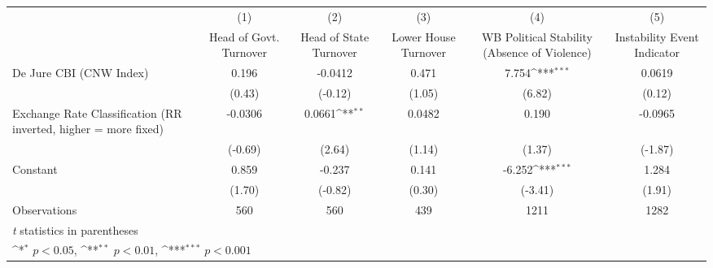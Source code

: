{
\def\sym#1{\ifmmode^{#1}\else\(^{#1}\)\fi}
\begin{tabular*}{\linewidth}{@{\hskip\tabcolsep\extracolsep\fill}l*{5}{c}}
\toprule
                &\multicolumn{1}{c}{(1)}&\multicolumn{1}{c}{(2)}&\multicolumn{1}{c}{(3)}&\multicolumn{1}{c}{(4)}&\multicolumn{1}{c}{(5)}\\
                &\multicolumn{1}{c}{Head of Govt. Turnover}&\multicolumn{1}{c}{Head of State Turnover}&\multicolumn{1}{c}{Lower House Turnover}&\multicolumn{1}{c}{WB Political Stability (Absence of Violence)}&\multicolumn{1}{c}{Instability Event Indicator}\\
\midrule
De Jure CBI (CNW Index)&    0.196         &  -0.0412         &    0.471         &    7.754\sym{***}&   0.0619         \\
                &   (0.43)         &  (-0.12)         &   (1.05)         &   (6.82)         &   (0.12)         \\
\addlinespace
Exchange Rate Classification (RR inverted, higher = more fixed)&  -0.0306         &   0.0661\sym{**} &   0.0482         &    0.190         &  -0.0965         \\
                &  (-0.69)         &   (2.64)         &   (1.14)         &   (1.37)         &  (-1.87)         \\
\addlinespace
Constant        &    0.859         &   -0.237         &    0.141         &   -6.252\sym{***}&    1.284         \\
                &   (1.70)         &  (-0.82)         &   (0.30)         &  (-3.41)         &   (1.91)         \\
\midrule
Observations    &      560         &      560         &      439         &     1211         &     1282         \\
\bottomrule
\multicolumn{6}{l}{\footnotesize \textit{t} statistics in parentheses}\\
\multicolumn{6}{l}{\footnotesize \sym{*} \(p<0.05\), \sym{**} \(p<0.01\), \sym{***} \(p<0.001\)}\\
\end{tabular*}
}
